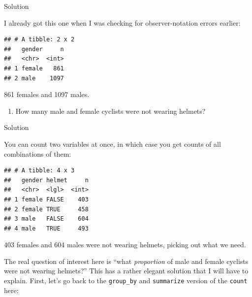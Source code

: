 \documentclass[]{tufte-book}
\newenvironment{Shaded}{}{}
\newcommand{\DataTypeTok}[1]{\textcolor[rgb]{0.56,0.13,0.00}{#1}}
\newcommand{\KeywordTok}[1]{\textcolor[rgb]{0.00,0.44,0.13}{\textbf{#1}}}
\newcommand{\NormalTok}[1]{#1}
\newcommand{\OperatorTok}[1]{\textcolor[rgb]{0.40,0.40,0.40}{#1}}
\newcommand{\StringTok}[1]{\textcolor[rgb]{0.25,0.44,0.63}{#1}}
\providecommand{\tightlist}{%
  \setlength{\itemsep}{0pt}\setlength{\parskip}{0pt}}
\theoremstyle{definition}
\theoremstyle{definition}
\theoremstyle{definition}
\theoremstyle{remark}
\begin{document}
Solution

I already got this one when I was checking for observer-notation errors
earlier:

\begin{Shaded}
\end{Shaded}

\begin{verbatim}
## # A tibble: 2 x 2
##   gender     n
##   <chr>  <int>
## 1 female   861
## 2 male    1097
\end{verbatim}

861 females and 1097 males.

\begin{enumerate}
\def\labelenumi{(\roman{enumi})}
\tightlist
\item
  How many male and female cyclists were not wearing helmets?
\end{enumerate}

Solution

You can count two variables at once, in which case you get counts of all
combinations of them:

\begin{Shaded}
\end{Shaded}

\begin{verbatim}
## # A tibble: 4 x 3
##   gender helmet     n
##   <chr>  <lgl>  <int>
## 1 female FALSE    403
## 2 female TRUE     458
## 3 male   FALSE    604
## 4 male   TRUE     493
\end{verbatim}

403 females and 604 males were not wearing helmets, picking out what we
need.

The real question of interest here is ``what \emph{proportion} of male
and female cyclists were not wearing helmets?''
This has a rather elegant solution that I will have to explain. First,
let's go back to the \texttt{group\_by} and \texttt{summarize} version
of the \texttt{count} here:

\begin{Shaded}
\end{Shaded}
\end{document}
